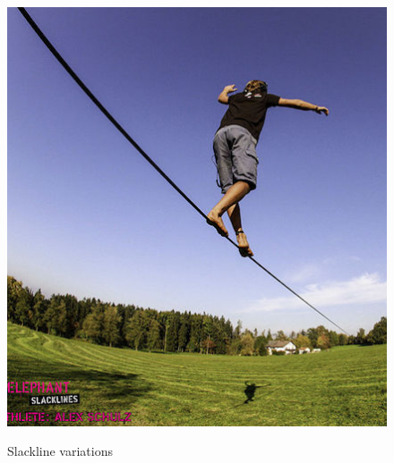 \begin{figure}[htb]
\begin{minipage}[t]{0.45\linewidth}
		\label{fig:rodeoline}
	\end{minipage}
	\hfill
	\begin{minipage}[t]{0.45\linewidth}
		\centering
		\includegraphics[width=1\linewidth]{Pictures/3_1_longline1}
		\label{fig:longline}
	\end{minipage}
	\caption{Slackline variations}
	\label{fig:slacklineVariation}
\end{figure}
\clearpage
